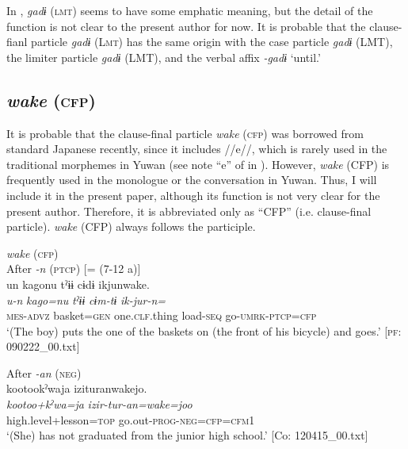 In , \textit{gadɨ} (\textsc{lmt}) seems to have some emphatic meaning, but the detail of the function is not clear to the present author for now. It is probable that the clause-fianl particle \textit{gadɨ} (L\textsc{mt}) has the same origin with the case particle \textit{gadɨ} (LMT), the limiter particle \textit{gadɨ} (LMT), and the verbal affix \textit{{}-gadɨ} ‘until.’

\subsection{\textit{wake} (\textsc{cfp})}\label{sec:10.3.11}

It is probable that the clause-final particle \textit{wake} (\textsc{cfp}) was borrowed from standard Japanese recently, since it includes //e//, which is rarely used in the traditional morphemes in Yuwan (see note “e” of  in ). However, \textit{wake} (CFP) is frequently used in the monologue or the conversation in Yuwan. Thus, I will include it in the present paper, although its function is not very clear for the present author. Therefore, it is abbreviated only as “CFP” (i.e. clause-final particle). \textit{wake} (CFP) always follows the participle.

\ea\label{ex:10.57}   \textit{wake} (\textsc{cfp})\\
  \ea After \textit{{}-n} (\textsc{ptcp}) [= (7-12 a)]\\
      \glll    un  kagonu  tˀɨɨ  cɨdɨ  ikjunwake.\\
    \textit{u-n}  \textit{kago=nu}  \textit{tˀɨɨ}  \textit{cɨm-tɨ}  \textit{ik-jur-n=}\\
    \textsc{mes}-\textsc{advz}  basket=\textsc{gen}  one.\textsc{clf}.thing  load-\textsc{seq}  go-\textsc{umrk}-\textsc{ptcp}=\textsc{cfp}\\
    \glt     ‘(The boy) puts the one of the baskets on (the front of his bicycle) and goes.’ [\textsc{pf}: 090222\_00.txt]

  \ex After \textit{{}-an} (\textsc{neg})\\
      \glll    kootookˀwaja  izituranwakejo.\\
    \textit{kootoo+kˀwa=ja}  \textit{izir-tur-an=wake=joo}\\
    high.level+lesson=\textsc{top}  go.out-\textsc{prog}-\textsc{neg}=\textsc{cfp}=\textsc{cfm}1\\
  \glt     ‘(She) has not graduated from the junior high school.’  [Co: 120415\_00.txt]
  \z
\z


